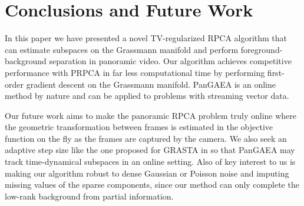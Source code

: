 \documentclass[10pt,twocolumn,letterpaper]{article}
\begin{document}
    


\section{Conclusions and Future Work} \label{section:conclusions}

In this paper we have presented a novel TV-regularized RPCA algorithm that can estimate subspaces on the Grassmann manifold and perform foreground-background separation in panoramic video. Our algorithm achieves competitive performance with PRPCA in far less computational time by performing first-order gradient descent on the Grassmann manifold. PanGAEA is an online method by nature and can be applied to problems with streaming vector data. 

Our future work aims to make the panoramic RPCA problem truly online where the geometric transformation between frames is estimated in the objective function on the fly as the frames are captured by the camera. We also seek an adaptive step size like the one proposed for GRASTA in \cite{grasta} so that PanGAEA may track time-dynamical subspaces in an online setting. Also of key interest to us is making our algorithm robust to dense Gaussian or Poisson noise and imputing missing values of the sparse components, since our method can only complete the low-rank background from partial information.

\newpage
{\small


}
\end{document}
